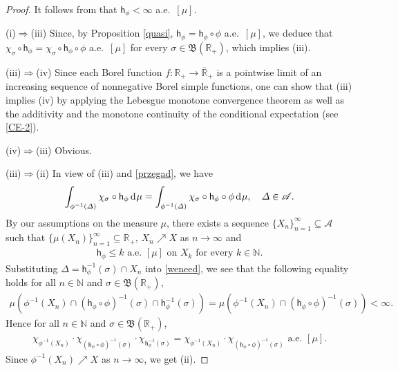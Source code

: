 \documentclass[draft,reqno]{amsproc}
\numberwithin{equation}{section}
\theoremstyle{remark}
\theoremstyle{definition}
\begin{document}
   \begin{proof}
It follows from \cite[Lemma 6.1]{ca-hor} that
${\mathsf h}_\phi < \infty$ a.e.\ $[\mu]$.

(i)$\Rightarrow$(iii) Since, by Proposition
\ref{quasi}, ${\mathsf h}_{\phi} = {\mathsf h}_{\phi}\circ \phi$
a.e.\ $[\mu]$, we deduce that $\chi_{\sigma} \circ
{\mathsf h}_{\phi} = \chi_{\sigma} \circ {\mathsf h}_{\phi} \circ
\phi$ a.e.\ $[\mu]$ for every $\sigma \in
{{\mathfrak B}({{\mathbb R}_+})}$, which implies (iii).

(iii)$\Rightarrow$(iv) Since each Borel function
$f\colon {\mathbb R}_+ \to {{\overline{\mathbb R}_+}}$ is a pointwise limit of an
increasing sequence of nonnegative Borel simple
functions, one can show that (iii) implies (iv) by
applying the Lebesgue monotone convergence theorem as
well as the additivity and the monotone continuity of
the conditional expectation (see \eqref{CE-2}).

(iv)$\Rightarrow$(iii) Obvious.

(iii)$\Rightarrow$(ii) In view of (iii) and
\eqref{przegad}, we have
   \begin{align} \label{weneed}
\int_{\phi^{-1}(\varDelta)} \chi_{\sigma} \circ
{\mathsf h}_{\phi} \operatorname{d\hspace{-0.25ex}} \mu = \int_{\phi^{-1}(\varDelta)}
\chi_{\sigma} \circ {\mathsf h}_{\phi} \circ \phi \operatorname{d\hspace{-0.25ex}} \mu,
\quad \varDelta \in {\mathscr A}.
   \end{align}
By our assumptions on the measure $\mu$, there exists
a sequence $\{X_n\}_{n=1}^\infty \subseteq {\mathscr A}$ such
that $\{\mu(X_n)\}_{n=1}^\infty \subseteq {\mathbb R}_+$,
$X_n \nearrow X$ as $n \to \infty$ and
   \begin{align} \label{hff-0}
{\mathsf h}_{\phi} {\leqslant} k \text{ a.e.\ $[\mu]$ on $X_k$ for
every $k\in {\mathbb N}$.}
   \end{align}
Substituting $\varDelta = {\mathsf h}_{\phi}^{-1}(\sigma)
\cap X_n$ into \eqref{weneed}, we see that the
following equality holds for all $n\in{\mathbb N}$ and
$\sigma \in {{\mathfrak B}({{\mathbb R}_+})}$,
   \begin{align*}
\mu(\phi^{-1}(X_n) \cap ({\mathsf h}_{\phi} \circ
\phi)^{-1}(\sigma) \cap {\mathsf h}_{\phi}^{-1}(\sigma)) =
\mu(\phi^{-1}(X_n) \cap ({\mathsf h}_{\phi} \circ
\phi)^{-1}(\sigma)) < \infty.
   \end{align*}
Hence for all $n\in{\mathbb N}$ and $\sigma \in
{{\mathfrak B}({{\mathbb R}_+})}$,
   \begin{align*}
\chi_{\phi^{-1}(X_n)} \cdot \chi_{({\mathsf h}_{\phi} \circ
\phi)^{-1}(\sigma)} \cdot
\chi_{{\mathsf h}_{\phi}^{-1}(\sigma)} =
\chi_{\phi^{-1}(X_n)} \cdot \chi_{({\mathsf h}_{\phi} \circ
\phi)^{-1}(\sigma)} \text{ a.e.\ $[\mu]$.}
   \end{align*}
Since $\phi^{-1}(X_n) \nearrow X$ as $n \to \infty$,
we get (ii).


\end{proof}
\end{document}

